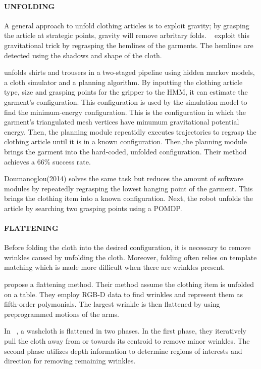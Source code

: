 \documentclass[\home/main.tex]{subfiles}
\begin{document}
    \paragraph{UNFOLDING}
	A general approach to unfold clothing articles is to exploit gravity; by grasping the article at strategic points, gravity will remove arbritary folds. ~\Textcite{Hamajima1998} exploit this gravitational trick by regrasping the hemlines of the garments. The hemlines are detected using the shadows and shape of the cloth. 

	\textcite{Cusumano2011} unfolds shirts and trousers in a two-staged pipeline using hidden markov models, a cloth simulator and a planning algorithm. By inputting the clothing article type, size and grasping points for the gripper to the \acrshort{HMM}, it can estimate the garment's configuration. This configuration is used by the simulation model to find the minimum-energy configuration. This is the configuration in which the garment's triangulated mesh vertices have minumum gravitational potential energy. Then, the planning module repeatidly executes trajectories to regrasp the clothing article until it is in a known configuration. Then,the planning module brings the garment into the hard-coded, unfolded configuration. Their method achieves a $66\%$ success rate. 

	Doumanoglou(2014) solves the same task but reduces the amount of software modules by repeatedly regrasping the lowest hanging point of the garment. This brings the clothing item into a known configuration. Next, the robot unfolds the article by searching two grasping points using a \acrshort{POMDP}. 

    \paragraph{FLATTENING}
	Before folding the cloth into the desired configuration, it is necessary to remove wrinkles caused by unfolding the cloth. Moreover, folding often relies on template matching which is made more difficult when there are wrinkles present.

	\autocite{Sun2015} propose a flattening method. Their method assume the clothing item is unfolded on a table. They employ RGB-D data to find wrinkles and represent them as fifth-order polymonials. The largest wrinkle is then flattened by using preprogrammed motions of the arms. 

	In ~\autocite{Willimon2011}, a washcloth is flattened in two phases. In the first phase, they iteratively pull the cloth away from or towards its centroid to remove minor wrinkles. The second phase utilizes depth information to determine regions of interests and direction for removing remaining wrinkles.
\end{document}
